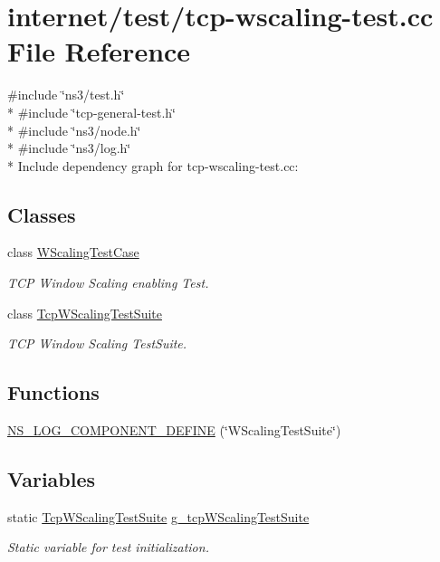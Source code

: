 \hypertarget{tcp-wscaling-test_8cc}{}\section{internet/test/tcp-\/wscaling-\/test.cc File Reference}
\label{tcp-wscaling-test_8cc}
{\ttfamily \#include \char`\"{}ns3/test.\+h\char`\"{}}\\*
{\ttfamily \#include \char`\"{}tcp-\/general-\/test.\+h\char`\"{}}\\*
{\ttfamily \#include \char`\"{}ns3/node.\+h\char`\"{}}\\*
{\ttfamily \#include \char`\"{}ns3/log.\+h\char`\"{}}\\*
Include dependency graph for tcp-\/wscaling-\/test.cc\+:
\subsection*{Classes}
\begin{DoxyCompactItemize}
\item 
class \hyperlink{classWScalingTestCase}{W\+Scaling\+Test\+Case}
\begin{DoxyCompactList}\small\item\em T\+CP Window Scaling enabling Test. \end{DoxyCompactList}\item 
class \hyperlink{classTcpWScalingTestSuite}{Tcp\+W\+Scaling\+Test\+Suite}
\begin{DoxyCompactList}\small\item\em T\+CP Window Scaling Test\+Suite. \end{DoxyCompactList}\end{DoxyCompactItemize}
\subsection*{Functions}
\begin{DoxyCompactItemize}
\item 
\hyperlink{tcp-wscaling-test_8cc_ab88331775f98c0941c99dc5d613cca92}{N\+S\+\_\+\+L\+O\+G\+\_\+\+C\+O\+M\+P\+O\+N\+E\+N\+T\+\_\+\+D\+E\+F\+I\+NE} (\char`\"{}W\+Scaling\+Test\+Suite\char`\"{})
\end{DoxyCompactItemize}
\subsection*{Variables}
\begin{DoxyCompactItemize}
\item 
static \hyperlink{classTcpWScalingTestSuite}{Tcp\+W\+Scaling\+Test\+Suite} \hyperlink{tcp-wscaling-test_8cc_a059e2b479a1001d9fe59a6c4bbc27a54}{g\+\_\+tcp\+W\+Scaling\+Test\+Suite}
\begin{DoxyCompactList}\small\item\em Static variable for test initialization. \end{DoxyCompactList}\end{DoxyCompactItemize}


